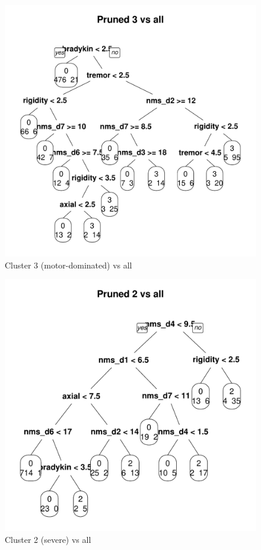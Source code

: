 \documentclass[letterpaper,12pt]{article}
\begin{document}
\begin{figure}[h]
  \centering
  \includegraphics[width=\linewidth]{dtree-3va-pruned.pdf}
  \caption{Cluster 3 (motor-dominated) vs all}
  \label{fig:3va}
\end{figure}

\begin{figure}[h]
  \centering
  \includegraphics[width=\linewidth]{dtree-2va-pruned.pdf}
  \caption{Cluster 2 (severe) vs all}
  \label{fig:2va}
\end{figure}
\end{document}
